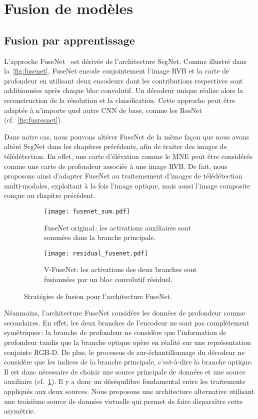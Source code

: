 \section{Fusion de modèles}

\subsection{Fusion par apprentissage}

L'approche FuseNet~\cite{hazirbas_fusenet_2016} est dérivée de l'architecture SegNet. Comme illustré dans la~\cref{fig:fusenet}, FuseNet encode conjointement l'image \gls{RVB} et la carte de profondeur en utilisant deux encodeurs dont les contributions respectives sont additionnées après chaque bloc convolutif. Un décodeur unique réalise alors la reconstruction de la résolution et la classification. Cette approche peut être adaptée à n'importe quel autre \gls{CNN} de base, comme les ResNet (cf.~\cref{fig:fusresnet}).

Dans notre cas, nous pouvons altérer FuseNet de la même façon que nous avons altéré SegNet dans les chapitres précédents, afin de traiter des images de télédétection. En effet, une carte d'élévation comme le \gls{MNE} peut être considérée comme une carte de profondeur associée à une image \gls{RVB}. De fait, nous proposons ainsi d'adapter FuseNet au traitemement d'images de télédétection multi-modales, exploitant à la fois l'image optique, mais aussi l'image composite conçue au chapitre précédent.

\begin{figure}[h]
	\begin{subfigure}{0.48\textwidth}
    	\texttt{[image: fusenet\_sum.pdf]}
        \caption{FuseNet original\,: les activations auxiliaires sont sommées dans la branche principale.}
        \label{fig:fusenet_sum}
    \end{subfigure}
    \hfill
    \begin{subfigure}{0.48\textwidth}
    	\texttt{[image: residual\_fusenet.pdf]}
        \caption{V-FuseNet: les activations des deux branches sont fusionnées par un bloc convolutif résiduel.}
        \label{fig:fusenet_mix}
    \end{subfigure}
    \caption{Stratégies de fusion pour l'architecture FuseNet.}
\end{figure}

Néanmoins, l'architecture FuseNet considère les données de profondeur comme secondaires. En effet, les deux branches de l'encodeur ne sont pas complètement symétriques\,: la branche de profondeur ne considère que l'information de profondeur tandis que la branche optique opère en réalité sur une représentation conjointe \gls{RGB-D}. De plus, le processus de sur-échantillonnage du décodeur ne considère que les indices de la branche principale, c'est-à-dire la branche optique. Il est donc nécessaire de choisir une source principale de données et une source auxiliaire (cf.~\cref{fig:fusenet_sum}). Il y a donc un déséquilibre fondamental entre les traitements appliqués aux deux sources. Nous proposons une architecture alternative utilisant une troisième source de données virtuelle qui permet de faire disparaître cette asymétrie.

